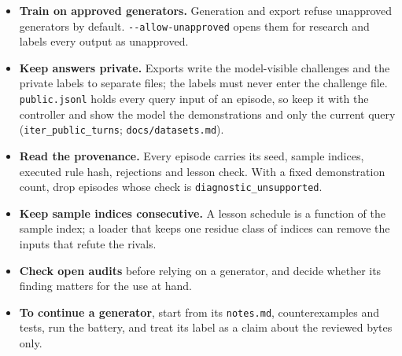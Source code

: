 \documentclass[11pt]{article}
\begin{document}
\begin{itemize}[nosep]
  \item \textbf{Train on approved generators.} Generation and export refuse unapproved generators by default. \texttt{-{}-allow-unapproved} opens them for research and labels every output as unapproved.
  \item \textbf{Keep answers private.} Exports write the model-visible challenges and the private labels to separate files; the labels must never enter the challenge file. \texttt{public.jsonl} holds every query input of an episode, so keep it with the controller and show the model the demonstrations and only the current query (\texttt{iter\_public\_turns}; \texttt{docs/datasets.md}).
  \item \textbf{Read the provenance.} Every episode carries its seed, sample indices, executed rule hash, rejections and lesson check. With a fixed demonstration count, drop episodes whose check is \texttt{diagnostic\_unsupported}.
  \item \textbf{Keep sample indices consecutive.} A lesson schedule is a function of the sample index; a loader that keeps one residue class of indices can remove the inputs that refute the rivals.
  \item \textbf{Check open audits} before relying on a generator, and decide whether its finding matters for the use at hand.
  \item \textbf{To continue a generator}, start from its \texttt{notes.md}, counterexamples and tests, run the battery, and treat its label as a claim about the reviewed bytes only.
\end{itemize}
\end{document}
